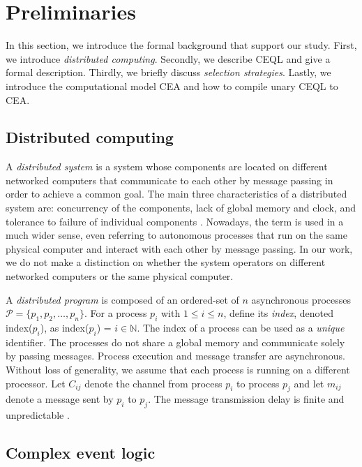 \chapter{Preliminaries}\label{chapter:preliminaries}

In this section, we introduce the formal background that support our study.
First, we introduce \emph{distributed computing}.
Secondly, we describe CEQL and give a formal description.
Thirdly, we briefly discuss \emph{selection strategies}.
Lastly, we introduce the computational model CEA and how to compile unary CEQL to CEA.

\section{Distributed computing}\label{sec:distributed_computing}

A \emph{distributed system} is a system whose components are located on different networked computers that communicate to each other by message passing in order to achieve a common goal. The main three characteristics of a distributed system are: concurrency of the components, lack of global memory and clock, and tolerance to failure of individual components \cite{distributed-computing-book}. Nowadays, the term is used in a much wider sense, even referring to autonomous processes that run on the same physical computer and interact with each other by message passing. In our work, we do not make a distinction on whether the system operators on different networked computers or the same physical computer.

A \emph{distributed program} is composed of an ordered-set of $n$ asynchronous processes $\mathcal{P} = \{ p_{1}, p_{2}, \ldots, p_{n}\}$. For a process $p_{i}$ with $1 \le i \le n$, define its \emph{index}, denoted index($p_{i}$), as index($p_{i}$) = $i \in \mathbb{N}$. The index of a process can be used as a \emph{unique} identifier. The processes do not share a global memory and communicate solely by passing messages. Process execution and message transfer are asynchronous. Without loss of generality, we assume that each process is running on a different processor. Let $C_{ij}$ denote the channel from process $p_{i}$ to process $p_{j}$ and let $m_{ij}$ denote a message sent by $p_{i}$ to $p_{j}$. The message transmission delay is finite and unpredictable \cite{distributed-computing-book}.

\section{Complex event logic}\label{sec:ceql}

